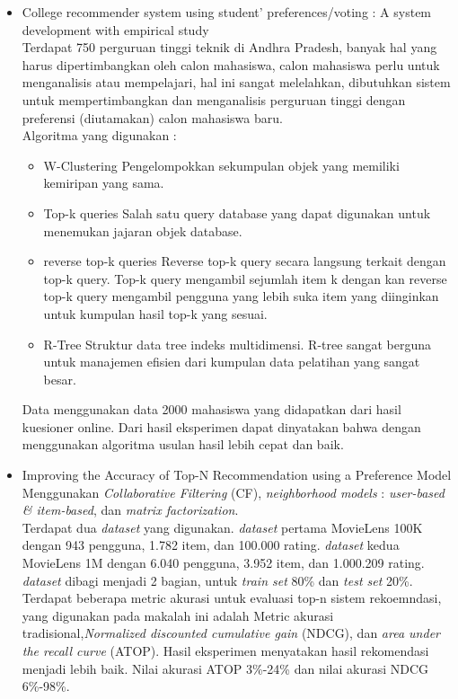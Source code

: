 \documentclass[a4paper,twoside]{article}
\begin{document}
\begin{enumerate}
\begin{enumerate}
\begin{itemize}
			\item College recommender system using student’ preferences/voting : A system development with empirical study\\
				Terdapat 750 perguruan tinggi teknik di Andhra Pradesh, banyak hal yang harus dipertimbangkan oleh calon mahasiswa, calon mahasiswa perlu untuk menganalisis atau mempelajari, hal ini sangat melelahkan, dibutuhkan sistem untuk mempertimbangkan dan menganalisis perguruan tinggi dengan preferensi (diutamakan) calon mahasiswa baru.\\
				Algoritma yang digunakan :
				\begin{itemize}
					\item W-Clustering
						Pengelompokkan sekumpulan objek yang memiliki kemiripan yang sama.
					\item Top-k queries
						Salah satu query database yang dapat digunakan untuk menemukan jajaran objek database.
					\item reverse top-k queries
						Reverse top-k query secara langsung terkait dengan top-k query. Top-k query mengambil sejumlah item k dengan kan reverse top-k query mengambil pengguna yang lebih suka item yang diinginkan untuk kumpulan hasil top-k yang sesuai.
					\item R-Tree
						Struktur data tree indeks multidimensi. R-tree sangat berguna untuk manajemen efisien dari kumpulan data pelatihan yang sangat besar. 
				\end{itemize}
		Data menggunakan data 2000 mahasiswa yang didapatkan dari hasil kuesioner online. Dari hasil eksperimen dapat dinyatakan bahwa dengan menggunakan algoritma usulan hasil lebih cepat dan baik.
		
			\item Improving the Accuracy of Top-N Recommendation using a Preference Model\\
			Menggunakan \textit{Collaborative Filtering} (CF), \textit{neighborhood models} : \textit{user-based \& item-based}, dan \textit{matrix factorization}.\\
			Terdapat dua \textit{dataset} yang digunakan. \textit{dataset} pertama MovieLens 100K dengan 943 pengguna, 1.782 item, dan 100.000 rating. \textit{dataset} kedua MovieLens 1M dengan 6.040 pengguna, 3.952 item, dan 1.000.209 rating. \textit{dataset} dibagi menjadi 2 bagian, untuk \textit{train set} 80\% dan \textit{test set} 20\%. 
			Terdapat beberapa metric akurasi untuk evaluasi top-n sistem rekoemndasi, yang digunakan pada makalah ini adalah Metric akurasi tradisional,\textit{Normalized discounted cumulative gain} (NDCG), dan  \textit{area under the recall curve} (ATOP).
			Hasil eksperimen menyatakan hasil rekomendasi menjadi lebih baik. Nilai akurasi ATOP 3\%-24\% dan nilai akurasi NDCG 6\%-98\%.
		\end{itemize}
					

\end{enumerate}
\end{enumerate}
\end{document}
